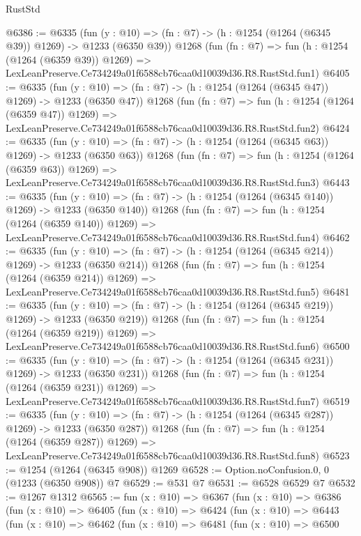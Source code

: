 \begin{lexlean}{RustStd}
\begin{coremodule}
@6386 := @6335
    (fun (y : @10) => (fn : @7) -> (h : @1254 (@1264 (@6345 @39)) @1269) -> @1233 (@6350 @39))
    @1268
    (fun (fn : @7) =>
    fun (h : @1254 (@1264 (@6359 @39)) @1269) =>
    LexLeanPreserve.Ce734249a01f6588cb76caa0d10039d36.R8.RustStd.fun1)
@6405 := @6335
    (fun (y : @10) => (fn : @7) -> (h : @1254 (@1264 (@6345 @47)) @1269) -> @1233 (@6350 @47))
    @1268
    (fun (fn : @7) =>
    fun (h : @1254 (@1264 (@6359 @47)) @1269) =>
    LexLeanPreserve.Ce734249a01f6588cb76caa0d10039d36.R8.RustStd.fun2)
@6424 := @6335
    (fun (y : @10) => (fn : @7) -> (h : @1254 (@1264 (@6345 @63)) @1269) -> @1233 (@6350 @63))
    @1268
    (fun (fn : @7) =>
    fun (h : @1254 (@1264 (@6359 @63)) @1269) =>
    LexLeanPreserve.Ce734249a01f6588cb76caa0d10039d36.R8.RustStd.fun3)
@6443 := @6335
    (fun (y : @10) => (fn : @7) -> (h : @1254 (@1264 (@6345 @140)) @1269) -> @1233 (@6350 @140))
    @1268
    (fun (fn : @7) =>
    fun (h : @1254 (@1264 (@6359 @140)) @1269) =>
    LexLeanPreserve.Ce734249a01f6588cb76caa0d10039d36.R8.RustStd.fun4)
@6462 := @6335
    (fun (y : @10) => (fn : @7) -> (h : @1254 (@1264 (@6345 @214)) @1269) -> @1233 (@6350 @214))
    @1268
    (fun (fn : @7) =>
    fun (h : @1254 (@1264 (@6359 @214)) @1269) =>
    LexLeanPreserve.Ce734249a01f6588cb76caa0d10039d36.R8.RustStd.fun5)
@6481 := @6335
    (fun (y : @10) => (fn : @7) -> (h : @1254 (@1264 (@6345 @219)) @1269) -> @1233 (@6350 @219))
    @1268
    (fun (fn : @7) =>
    fun (h : @1254 (@1264 (@6359 @219)) @1269) =>
    LexLeanPreserve.Ce734249a01f6588cb76caa0d10039d36.R8.RustStd.fun6)
@6500 := @6335
    (fun (y : @10) => (fn : @7) -> (h : @1254 (@1264 (@6345 @231)) @1269) -> @1233 (@6350 @231))
    @1268
    (fun (fn : @7) =>
    fun (h : @1254 (@1264 (@6359 @231)) @1269) =>
    LexLeanPreserve.Ce734249a01f6588cb76caa0d10039d36.R8.RustStd.fun7)
@6519 := @6335
    (fun (y : @10) => (fn : @7) -> (h : @1254 (@1264 (@6345 @287)) @1269) -> @1233 (@6350 @287))
    @1268
    (fun (fn : @7) =>
    fun (h : @1254 (@1264 (@6359 @287)) @1269) =>
    LexLeanPreserve.Ce734249a01f6588cb76caa0d10039d36.R8.RustStd.fun8)
@6523 := @1254 (@1264 (@6345 @908)) @1269
@6528 := Option.noConfusion.{0, 0} (@1233 (@6350 @908)) @7
@6529 := @531 @7
@6531 := @6528 @6529 @7
@6532 := @1267 @1312
@6565 := fun (x : @10) =>
  @6367
    (fun (x : @10) =>
    @6386
      (fun (x : @10) =>
      @6405
        (fun (x : @10) =>
        @6424
          (fun (x : @10) =>
          @6443
            (fun (x : @10) =>
            @6462
              (fun (x : @10) =>
              @6481
                (fun (x : @10) =>
                @6500

\end{coremodule}
\end{lexlean}
